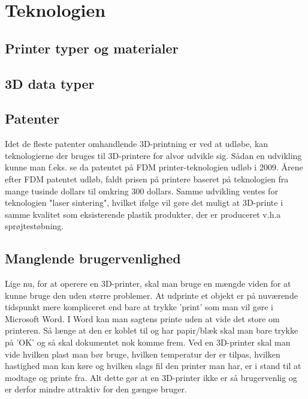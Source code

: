 \section{Teknologien} %



\subsection{Printer typer og materialer} %
\label{sub:materialer}



\subsection{3D data typer}




\subsection{Patenter} %
\label{sub:patenter}

Idet de fleste patenter omhandlende 3D-printning er ved at udløbe, kan teknologierne der bruges til 3D-printere for alvor udvikle sig. Sådan en udvikling kunne man f.eks. se da patentet på FDM printer-teknologien udløb i 2009. \autocite{manyika_disruptive_2013} Årene efter FDM patentet udløb, faldt prisen på printere baseret på teknologien fra mange tusinde dollars til omkring 300 dollars. \autocite{mims_3d_2013} Samme udvikling ventes for teknologien "laser sintering", hvilket ifølge \autocite{mims_3d_2013} vil gøre det muligt at 3D-printe i samme kvalitet som eksisterende plastik produkter, der er produceret v.h.a sprøjtestøbning.


\subsection{Manglende brugervenlighed} %
\label{sub:manglende_brugervenlighed}

Lige nu, for at operere en 3D-printer, skal man bruge en mængde viden for at kunne bruge den uden større problemer. At udprinte et objekt er på nuværende tidspunkt mere kompliceret end bare at trykke ’print’ som man vil gøre i Microsoft Word. I Word kan man sagtens printe uden at vide det store om printeren. Så længe at den er koblet til og har papir/blæk skal man bare trykke på ’OK’ og så skal dokumentet nok komme frem. 
Ved en 3D-printer skal man vide hvilken plast man bør bruge, hvilken temperatur der er tilpas, hvilken hastighed man kan køre og hvilken slags fil den printer man har, er i stand til at modtage og printe fra.
Alt dette gør at en 3D-printer ikke er så brugervenlig og er derfor mindre attraktiv for den gængse bruger.



